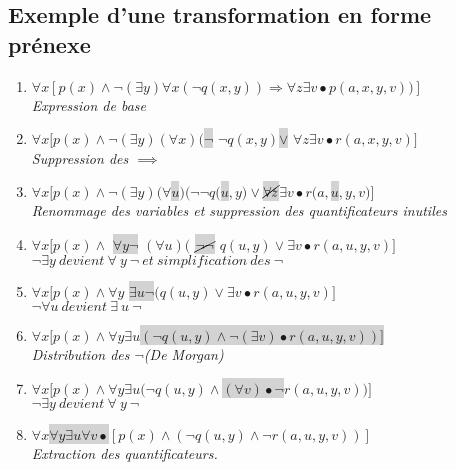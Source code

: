 {\subsection{Exemple d'une transformation en forme prénexe}
\begin{enumerate}
\item $\forall x  [p(x) \land \neg (\exists y) \forall x ( \neg q(x,y))
    \Rightarrow\forall z \exists v \bullet p(a,x,y,v))]$\\ \textit{Expression de base}
\item $\forall x [p(x) \land \neg(\exists y) (\forall x) ($\colorbox{lightgray}{$\neg$} $\neg q(x,y) $\colorbox{lightgray}{$\lor$} $\forall z \exists v \bullet r(a,x,y,v)]$\\\textit{Suppression des $\implies{}$} 
\item $\forall x [p(x) \land \neg(\exists y) (\forall $\colorbox{lightgray}{$u$}$)(\neg\neg q($\colorbox{lightgray}{$u$}$,y) \lor $\colorbox{lightgray}{$\cancel{\forall z}$}$\exists v \bullet r(a,$\colorbox{lightgray}{$u$}$,y,v)]$\\\textit{Renommage des variables et suppression des quantificateurs inutiles}
\item $\forall x [p(x) \land$ \colorbox{lightgray}{$\forall y \neg$} $ (\forall u)($ \colorbox{lightgray}{$\cancel{\neg \neg}$} $q(u,y) \lor \exists v \bullet r(a,u,y,v)] $\\$\neg\exists y\ devient\  \forall \ y\ \neg \ et\ simplification\ des\ \neg$
\item $\forall x [p(x) \land \forall y $ \colorbox{lightgray}{$\exists u \neg$}$(q(u,y) \lor \exists v \bullet r(a,u,y,v)] $\\$\neg\forall u\ devient\  \exists \ u\ \neg$
\item $\forall x [p(x) \land \forall y \exists u $\colorbox{lightgray}{$(\neg q(u,y) \land \neg (\exists v) \bullet r(a,u,y,v))]$}\\ \textit{Distribution des $\neg$}\textit{(De Morgan)}
\item $\forall x [p(x) \land \forall y \exists u (\neg q(u,y) \land $\colorbox{lightgray}{$(\forall v) \bullet \neg$}$ r(a,u,y,v))]$\\$\neg\exists y\ devient\  \forall \ y\ \neg$
\item $\forall x$\colorbox{lightgray}{$ \forall y \exists u \forall v  \bullet$}$ [p(x) \land (\neg q(u,y) \land  \neg r(a,u,y,v))]$\\\textit{Extraction des quantificateurs.}
\end{enumerate}

}
